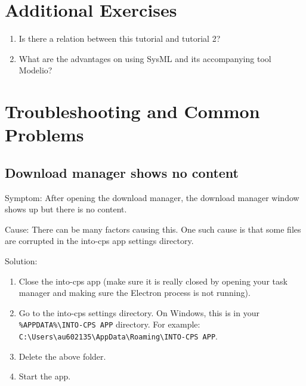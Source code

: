\documentclass[11pt,a4paper]{../tutorial}
\begin{document}
\section{Additional Exercises}

\begin{enumerate}
  \item Is there a relation between this tutorial and tutorial 2?
  \item What are the advantages on using SysML and its accompanying tool Modelio?
\end{enumerate}


\section{Troubleshooting and Common Problems}

\subsection{Download manager shows no content}

Symptom: After opening the download manager, the download manager window shows up but there is no content.

Cause: There can be many factors causing this. One such cause is that some files are corrupted in the into-cps app settings directory. 

Solution: 
\begin{enumerate}
	\item Close the into-cps app (make sure it is really closed by opening your task manager and making sure the Electron process is not running).
	\item Go to the into-cps settings directory. On Windows, this is in your \verb=%APPDATA%\INTO-CPS APP= directory. For example: \verb=C:\Users\au602135\AppData\Roaming\INTO-CPS APP=.
	\item Delete the above folder.
	\item Start the app.
\end{enumerate}
\end{document}
